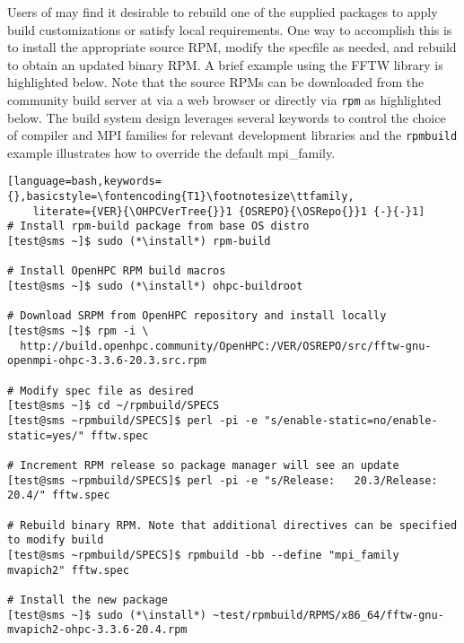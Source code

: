 Users of \OHPC{} may find it desirable to rebuild one of the supplied packages
to apply build customizations or satisfy local requirements. One way to
accomplish this is to install the appropriate source RPM, modify the specfile
as needed, and rebuild to obtain an updated binary RPM. A brief example using
the FFTW library is highlighted below.  Note that the source RPMs can be downloaded from the
community build server at \href{https://build.openhpc.community}
{\color{blue}{https://build.openhpc.community}} via a web browser or directly
via \texttt{rpm} as highlighted below. The \OHPC{} build system design
leverages several keywords to control the choice of compiler and MPI families
for relevant development libraries and the \texttt{rpmbuild} example
illustrates how to override the default mpi\_family.

\begin{lstlisting}[language=bash,keywords={},basicstyle=\fontencoding{T1}\footnotesize\ttfamily,
    literate={VER}{\OHPCVerTree{}}1 {OSREPO}{\OSRepo{}}1 {-}{-}1]
# Install rpm-build package from base OS distro
[test@sms ~]$ sudo (*\install*) rpm-build

# Install OpenHPC RPM build macros
[test@sms ~]$ sudo (*\install*) ohpc-buildroot

# Download SRPM from OpenHPC repository and install locally
[test@sms ~]$ rpm -i \
  http://build.openhpc.community/OpenHPC:/VER/OSREPO/src/fftw-gnu-openmpi-ohpc-3.3.6-20.3.src.rpm

# Modify spec file as desired
[test@sms ~]$ cd ~/rpmbuild/SPECS
[test@sms ~rpmbuild/SPECS]$ perl -pi -e "s/enable-static=no/enable-static=yes/" fftw.spec

# Increment RPM release so package manager will see an update
[test@sms ~rpmbuild/SPECS]$ perl -pi -e "s/Release:   20.3/Release:   20.4/" fftw.spec

# Rebuild binary RPM. Note that additional directives can be specified to modify build
[test@sms ~rpmbuild/SPECS]$ rpmbuild -bb --define "mpi_family mvapich2" fftw.spec

# Install the new package
[test@sms ~]$ sudo (*\install*) ~test/rpmbuild/RPMS/x86_64/fftw-gnu-mvapich2-ohpc-3.3.6-20.4.rpm
\end{lstlisting}
